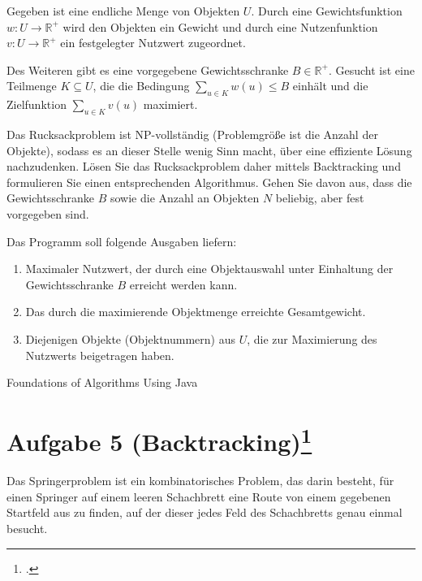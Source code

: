 \documentclass{lehramt-informatik}
\begin{document}
Gegeben ist eine endliche Menge von Objekten $U$. Durch eine
Gewichtsfunktion $w : U \rightarrow \mathbb{R}^+$ wird den Objekten ein
Gewicht und durch eine Nutzenfunktion $v : U \rightarrow \mathbb{R}^+$
ein festgelegter Nutzwert zugeordnet.

Des Weiteren gibt es eine vorgegebene Gewichtsschranke $B \in
\mathbb{R}^+$. Gesucht ist eine Teilmenge $K \subseteq U$, die die
Bedingung $\sum_{u \in K} w(u) \leq B$ einhält und die Zielfunktion
$\sum_{u \in K} v(u)$ maximiert.

Das Rucksackproblem ist NP-vollständig (Problemgröße ist die Anzahl der
Objekte), sodass es an dieser Stelle wenig Sinn macht, über eine
effiziente Lösung nachzudenken. Lösen Sie das Rucksackproblem daher
mittels Backtracking und formulieren Sie einen entsprechenden
Algorithmus. Gehen Sie davon aus, dass die Gewichtsschranke $B$ sowie
die Anzahl an Objekten $N$ beliebig, aber fest vorgegeben sind.

Das Programm soll folgende Ausgaben liefern:

\begin{enumerate}
\item  Maximaler Nutzwert, der durch eine Objektauswahl unter Einhaltung
der Gewichtsschranke $B$ erreicht werden kann.

\item Das durch die maximierende Objektmenge erreichte Gesamtgewicht.

\item Diejenigen Objekte (Objektnummern) aus $U$, die zur Maximierung
des Nutzwerts beigetragen haben.

\end{enumerate}

\begin{antwort}
Foundations of Algorithms Using Java
\end{antwort}

%

\section{Aufgabe 5 (Backtracking)\footcite{examen:46115:2018:09}}

Das Springerproblem ist ein kombinatorisches Problem, das darin besteht,
für einen Springer auf einem leeren Schachbrett eine Route von einem
gegebenen Startfeld aus zu finden, auf der dieser jedes Feld des
Schachbretts genau einmal besucht.
\end{document}
